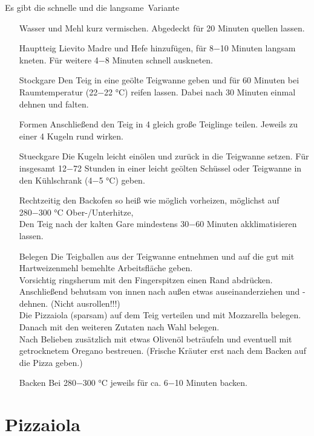 Es gibt die schnelle und die \glqq langsame\grqq\ Variante
\begin{enumerate}
    \item [\GLS{Autolyse}] Wasser und Mehl kurz vermischen. Abgedeckt für 20 Minuten quellen lassen.
    
    \item [\Gls{Hauptteig}] Lievito Madre und Hefe hinzufügen, für 8−10 Minuten langsam kneten. Für weitere 4−8 Minuten schnell auskneten.
    \item [\Gls{Stockgare}] Den Teig in eine geölte Teigwanne geben und für 60 Minuten bei Raumtemperatur (22−22 °C) reifen lassen.
    Dabei nach 30 Minuten einmal dehnen und falten.
    \item [\Gls{Formen}]  Anschließend den Teig in 4 gleich große Teiglinge teilen. Jeweils zu einer 4 Kugeln rund wirken.
    \item [\Gls{Stueckgare}]  Die Kugeln leicht einölen und zurück in die Teigwanne setzen. Für insgesamt 12−72 Stunden in einer leicht geölten Schüssel oder Teigwanne in den Kühlschrank (4−5 °C) geben.
    \item [\GLS{Akklimatisieren}] Rechtzeitig den Backofen so heiß wie möglich vorheizen, möglichst auf 280−300 °C Ober-/Unterhitze,\\
    Den Teig nach der kalten Gare mindestens 30−60 Minuten akklimatisieren lassen.
    \item[Belegen] 
    Die Teigballen aus der Teigwanne entnehmen und auf die gut mit Hartweizenmehl bemehlte Arbeitsfläche geben.\\
    Vorsichtig ringsherum mit den Fingerspitzen einen Rand abdrücken.
    Anschließend behutsam von innen nach außen etwas auseinanderziehen und -dehnen. (Nicht ausrollen!!!)\\
    Die Pizzaiola (sparsam) auf dem Teig verteilen und mit Mozzarella belegen.\\
    Danach mit den weiteren Zutaten nach Wahl belegen.\\
    Nach Belieben zusätzlich mit etwas Olivenöl beträufeln und eventuell mit getrocknetem Oregano bestreuen. (Frische Kräuter erst nach dem Backen auf die Pizza geben.)
    \item [\Gls{Backen}] Bei 280−300 °C jeweils für ca. 6−10 Minuten backen. 
\end{enumerate}
%

\section{Pizzaiola}
